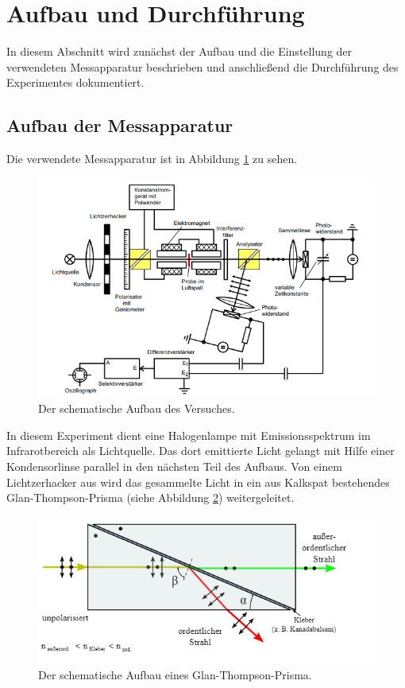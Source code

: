 \section{Aufbau und Durchführung}
\label{sec:Durchführung}
In diesem Abschnitt wird zunächst der Aufbau und die Einstellung der verwendeten Messapparatur beschrieben und anschließend die Durchführung des Experimentes dokumentiert.
\subsection{Aufbau der Messapparatur}
\label{sec:aufbau}
Die verwendete Messapparatur ist in Abbildung \ref{fig:messapp} zu sehen.
\begin{figure}[h]
  \centering
  \includegraphics[scale=0.5]{fig/messapp.png}
  \caption{Der schematische Aufbau des Versuches. \cite[2]{Anleitung2}}
  \label{fig:messapp}
\end{figure}
In diesem Experiment dient eine Halogenlampe mit Emissionsspektrum im Infrarotbereich als Lichtquelle. Das dort emittierte Licht gelangt mit Hilfe einer Kondensorlinse parallel in den nächsten Teil des Aufbaus. Von einem Lichtzerhacker aus wird das gesammelte Licht in ein aus Kalkspat bestehendes Glan-Thompson-Prisma (siehe Abbildung \ref{fig:glan}) weitergeleitet.
\begin{figure}[h!]
  \centering
  \includegraphics[scale=0.5]{fig/glan.png}
  \caption{Der schematische Aufbau eines Glan-Thompson-Prisma. \cite{Anleitung3}}
  \label{fig:glan}
\end{figure}
